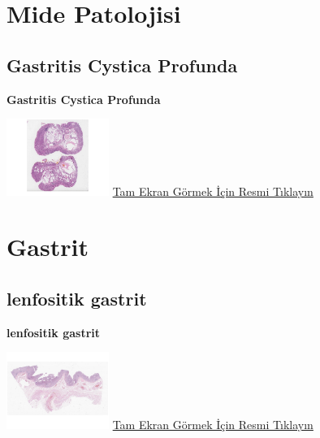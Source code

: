 \documentclass[
  letterpaper,
  DIV=11,
  numbers=noendperiod]{scrreprt}
\begin{document}
\hypertarget{sec-mide-patolojisi}{%
\chapter{Mide Patolojisi}\label{sec-mide-patolojisi}}

\hypertarget{sec-gastritis-cystica-profunda}{%
\section{Gastritis Cystica
Profunda}\label{sec-gastritis-cystica-profunda}}

\textbf{Gastritis Cystica Profunda}

\href{https://images.patolojiatlasi.com/gastritis-cystica-profunda/HE.html}{\includegraphics[width=0.25\textwidth,height=\textheight]{./screenshots/gastritis-cystica-profunda_screenshot.png}}
\href{https://images.patolojiatlasi.com/gastritis-cystica-profunda/HE.html}{Tam
Ekran Görmek İçin Resmi Tıklayın}

\hypertarget{sec-gastrit}{%
\chapter{Gastrit}\label{sec-gastrit}}

\hypertarget{sec-lymphocytic-gastritis}{%
\section{lenfositik gastrit}\label{sec-lymphocytic-gastritis}}

\textbf{lenfositik gastrit}

\href{https://images.patolojiatlasi.com/lymphocytic-gastritis/all.html}{\includegraphics[width=0.25\textwidth,height=\textheight]{./screenshots/lymphocytic-gastritis-all_screenshot.png}}
\href{https://images.patolojiatlasi.com/lymphocytic-gastritis/all.html}{Tam
Ekran Görmek İçin Resmi Tıklayın}
\end{document}
